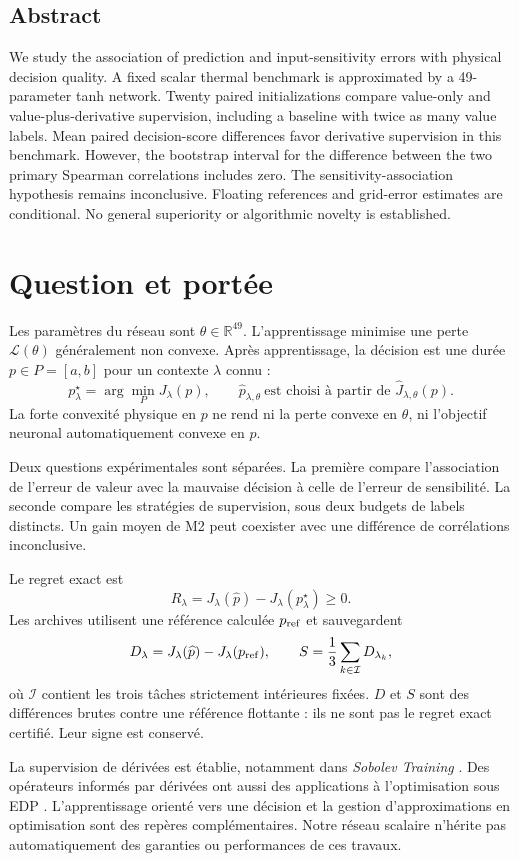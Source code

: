 \documentclass[11pt,a4paper]{article}
\newcommand{\Jhat}{\widehat J_{\lambda,\theta}}
\begin{document}
\subsection*{Abstract}
We study the association of prediction and input-sensitivity errors with
physical decision quality. A fixed scalar thermal benchmark is approximated
by a 49-parameter tanh network. Twenty paired initializations compare value-only
and value-plus-derivative supervision, including a baseline with twice as many
value labels. Mean paired decision-score differences favor derivative supervision
in this benchmark. However, the bootstrap interval for the difference between
the two primary Spearman correlations includes zero. The sensitivity-association
hypothesis remains inconclusive. Floating references and grid-error estimates
are conditional. No general superiority or algorithmic novelty is established.

\clearpage
\section{Question et portée}
\label{sec:question}
Les paramètres du réseau sont $\theta\in\mathbb R^{49}$. L'apprentissage
minimise une perte $\mathcal L(\theta)$ généralement non convexe.
Après apprentissage, la décision est une durée $p\in P=[a,b]$ pour un contexte
$\lambda$ connu :
\[
p^\star_\lambda=\arg\min_P J_\lambda(p),\qquad
\widehat p_{\lambda,\theta}\ \text{est choisi à partir de }\Jhat(p).
\]
La forte convexité physique en $p$ ne rend ni la perte convexe en $\theta$,
ni l'objectif neuronal automatiquement convexe en $p$.

Deux questions expérimentales sont séparées. La première compare l'association
de l'erreur de valeur avec la mauvaise décision à celle de l'erreur de
sensibilité. La seconde compare les stratégies de supervision, sous deux
budgets de labels distincts. Un gain moyen de M2 peut coexister avec une
différence de corrélations inconclusive.

Le regret exact est
\[
R_\lambda=J_\lambda(\widehat p)-J_\lambda(p^\star_\lambda)\geq0.
\]
Les archives utilisent une référence calculée $p_{\rm ref}$ et sauvegardent
\[
D_\lambda=J_\lambda(\widehat p)-J_\lambda(p_{\rm ref}),\qquad
S=\frac13\sum_{k\in\mathcal I}D_{\lambda_k},
\]
où $\mathcal I$ contient les trois tâches strictement intérieures fixées.
$D$ et $S$ sont des différences brutes contre une référence flottante :
ils ne sont pas le regret exact certifié. Leur signe est conservé.

La supervision de dérivées est établie, notamment dans \emph{Sobolev Training}
\cite{sobolev}. Des opérateurs informés par dérivées ont aussi des applications
à l'optimisation sous EDP \cite{dino}. L'apprentissage orienté vers une décision
\cite{spo} et la gestion d'approximations en optimisation \cite{trust} sont des
repères complémentaires. Notre réseau scalaire n'hérite pas automatiquement
des garanties ou performances de ces travaux.
\end{document}
